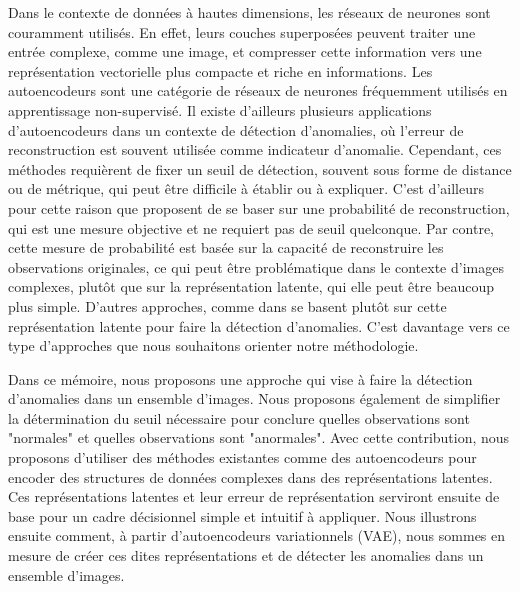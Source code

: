 Dans le contexte de données à hautes dimensions, les réseaux de neurones sont couramment utilisés. En effet, leurs couches superposées peuvent traiter une entrée complexe, comme une image, et compresser cette information vers une représentation vectorielle plus compacte et riche en informations. Les autoencodeurs sont une catégorie de réseaux de neurones fréquemment utilisés en apprentissage non-supervisé. Il existe d'ailleurs plusieurs applications d'autoencodeurs dans un contexte de détection d'anomalies, où l'erreur de reconstruction est souvent utilisée comme indicateur d'anomalie. Cependant, ces méthodes requièrent de fixer un seuil de détection, souvent sous forme de distance ou de métrique, qui peut être difficile à établir ou à expliquer. C'est d'ailleurs pour cette raison que  \cite{An2015VariationalAB} proposent de se baser sur une probabilité de reconstruction, qui est une mesure objective et ne requiert pas de seuil quelconque. Par contre, cette mesure de probabilité est basée sur la capacité de reconstruire les observations originales, ce qui peut être problématique dans le contexte d'images complexes, plutôt que sur la représentation latente, qui elle peut être beaucoup plus simple. D'autres approches, comme dans \cite{DBLP:journals/corr/abs-1802-06360} se basent plutôt sur cette représentation latente pour faire la détection d'anomalies. C'est davantage vers ce type d'approches que nous souhaitons orienter notre méthodologie. 

Dans ce mémoire, nous proposons une approche qui vise à faire la détection d'anomalies dans un ensemble d'images. Nous proposons également de simplifier la détermination du seuil nécessaire pour conclure quelles observations sont "normales" et quelles observations sont "anormales". Avec cette contribution, nous proposons d'utiliser des méthodes existantes comme des autoencodeurs  pour encoder des structures de données complexes dans des représentations latentes. Ces représentations latentes et leur erreur de représentation serviront ensuite de base pour un cadre décisionnel simple et intuitif à appliquer. Nous illustrons ensuite comment, à partir d'autoencodeurs variationnels (VAE), nous sommes en mesure de créer ces dites représentations et de détecter les anomalies dans un ensemble d'images.